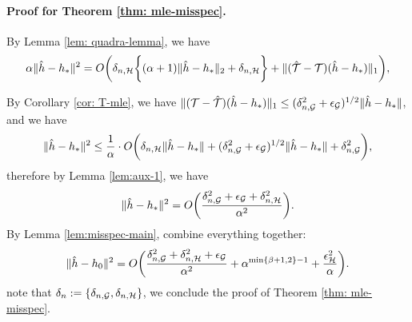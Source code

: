 \paragraph{Proof for Theorem \ref{thm: mle-misspec}.}
By Lemma \ref{lem: quadra-lemma}, we have \begin{align*}
    \alpha \|\hat{h} - h_{*}\|^2 =  O\bigg(\delta_{n,\mathcal{H}}\bigg\{ (\alpha+1)  \|\hat h-h_*\|_2   +  \delta_{n,\mathcal{H}}   \bigg\}+  \|(\hat {{\mathcal{T}}}-{\mathcal{T}})(\hat h-h_*)\|_1\bigg),
\end{align*}

By Corollary \ref{cor: T-mle}, we have $\|({\mathcal{T}} - \hat{{\mathcal{T}}})(\hat{h} - h_*)\|_1  \leq (\delta_{n,\mathcal{G}}^2 +\epsilon_{\mathcal{G}})^{1/2}\|\hat{h} - h_*\|$, 
and we have $$
\|\hat{h} - h_*\|^2 \leq \frac{1}{\alpha}\cdot O\bigg(\delta_{n,\mathcal{H}} \|\hat{h} - h_*\| +  (\delta_{n,\mathcal{G}}^2 +\epsilon_{\mathcal{G}} )^{1/2}\|\hat{h} - h_*\| + \delta_{n,\mathcal{G}}^2 \bigg), 
$$
therefore by Lemma \ref{lem:aux-1}, we have
\begin{align}
    \|\hat{h} - h_*\|^2 = O\bigg(\frac{\delta_{n,\mathcal{G}}^2 + \epsilon_{\mathcal{G}} + \delta_{n,\mathcal{H}}^2}{\alpha^2}   \bigg). \label{eqn: misspec_G_only}
\end{align}
By Lemma \ref{lem:misspec-main}, combine everything together: $$
\|\hat{h} - h_0\|^2 = O\bigg(\frac{\delta_{n,\mathcal{G}}^2+ \delta_{n,\mathcal{H}}^2 + \epsilon_{\mathcal{G}}}{\alpha^2} + \alpha^{\min\{\beta+1,2\}-1}+\frac{\epsilon_{\mathcal{H}}^2}{\alpha}\bigg).
$$
note that $\delta_n :=\{\delta_{n,\mathcal{G}}, \delta_{n,\mathcal{H}}\}$, we conclude the proof of Theorem \ref{thm: mle-misspec}.
